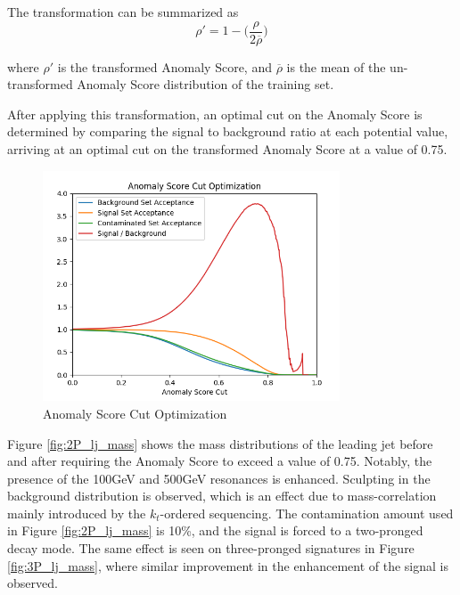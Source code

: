 \documentclass[12pt, a4paper]{article}
\begin{document}
The transformation can be summarized as
\begin{equation}
	\rho ' = 1 - \bigg(\frac{\rho}{2\overline{\rho}}\bigg)
\end{equation}

where $\rho '$ is the transformed Anomaly Score, and  $\overline{\rho}$ is the mean of the un-transformed Anomaly Score distribution of the training set. 

After applying this transformation, an optimal cut on the Anomaly Score is determined by comparing the signal to background ratio at each potential value, arriving at an optimal cut on the transformed Anomaly Score at a value of 0.75.

\begin{figure}[H]
	\begin{center}
		\includegraphics[width=250pt]{imgs/Score_Opt.png}
	\end{center}
	\caption{Anomaly Score Cut Optimization}
	\label{fig:aucs_vs_contam}
\end{figure}

Figure \ref{fig:2P_lj_mass} shows the mass distributions of the leading jet before and after requiring the Anomaly Score to exceed a value of 0.75. Notably, the presence of the 100GeV and 500GeV resonances is enhanced. Sculpting in the background distribution is observed, which is an effect due to mass-correlation mainly introduced by the $k_{t}$-ordered sequencing. The contamination amount used in Figure \ref{fig:2P_lj_mass} is 10\%, and the signal is forced to a two-pronged decay mode. The same effect is seen on three-pronged signatures in Figure \ref{fig:3P_lj_mass}, where similar improvement in the enhancement of the signal is observed. 
\end{document}
